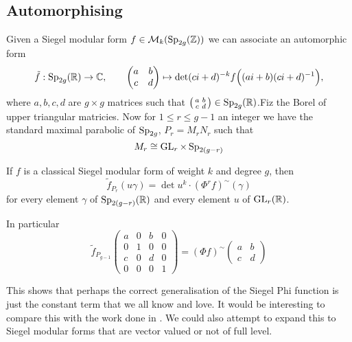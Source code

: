 \subsection{Automorphising}
Given a Siegel modular form \(f\in \mathcal{M}_k(\Sp_{2g}(\Z))\) we can associate an automorphic form
\[\tilde{f} : \Sp_{2g}(\R)\to\C, \qquad \begin{pmatrix} a & b\\ c & d\end{pmatrix}\mapsto \det(ci+d)^{-k} f\Bigl((ai+b)(ci+d)\inv\Bigr), \]
where \(a,b,c,d\) are \(g\times g\) matrices such that \(\bigl(\begin{smallmatrix} a & b\\ c & d\end{smallmatrix}\bigr)\in\Sp_{2g}(\R)\).Fiz the Borel of upper triangular matricies. Now for \(1\leq r\leq g-1\) an integer we have the standard maximal parabolic of \(\operatorname{Sp}_{2g}\), \(P_r = M_rN_r\) such that 
\[M_r \cong \operatorname{GL}_r\times \operatorname{Sp}_{2(g-r)}\]

\begin{Theorem}[Zhang]
	If \(f\) is a classical Siegel modular form of weight \(k\) and degree \(g\), then
	\begin{equation} 
		\tilde f_{P_r}(u\gamma) = \det u^k\cdot (\Phi^{r} f)^\sim(\gamma)
	\end{equation}
	for every element \(\gamma\) of \(\Sp_{2(g-r)}(\R)\) and every element \(u\) of \(\GL_{r}(\R)\).

 In particular 
 \[\tilde{f}_{P_{g-1}}\begin{pmatrix} a & 0 & b & 0\\ 0 & 1 & 0 & 0\\ c & 0 & d & 0\\ 0 & 0 & 0 & 1\end{pmatrix} = (\Phi f)^\sim\begin{pmatrix}
     a & b\\
     c& d
 \end{pmatrix}\]
\end{Theorem}

This shows that perhaps the correct generalisation of the Siegel Phi function is just the constant term that we all know and love. It would be interesting to compare this with the work done in \cite{grenierANALOGUESIEGELXOPERATOR2024}. We could also attempt to expand this to Siegel modular forms that are vector valued or not of full level.

